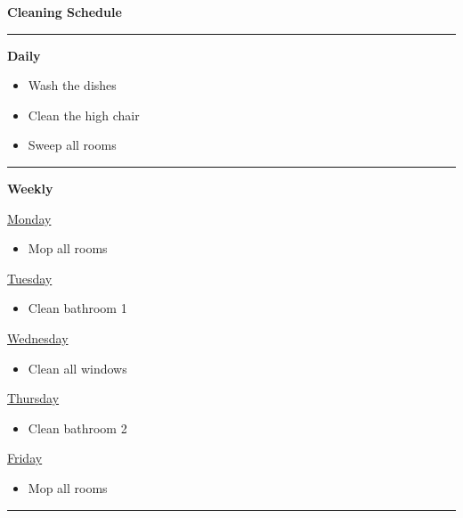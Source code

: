 \documentclass[14pt]{extarticle}
\begin{document}
\begin{center}
  \textsf{\textbf{\Large{}Cleaning Schedule}}
\end{center}

\bigskip

\hrule

\bigskip

\textsf{\textbf{\large{}Daily}}

\begin{itemize}
  \item Wash the dishes
  \item Clean the high chair
  \item Sweep all rooms
\end{itemize}

\hrule

\bigskip

\textsf{\textbf{\large{}Weekly}}

\bigskip

\textsf{\underline{Monday}}

\begin{itemize}
  \item Mop all rooms
\end{itemize}

\textsf{\underline{Tuesday}}

\begin{itemize}
  \item Clean bathroom 1
\end{itemize}

\textsf{\underline{Wednesday}}

\begin{itemize}
  \item Clean all windows
\end{itemize}

\textsf{\underline{Thursday}}

\begin{itemize}
  \item Clean bathroom 2
\end{itemize}

\textsf{\underline{Friday}}

\begin{itemize}
  \item Mop all rooms
\end{itemize}

\bigskip

\hrule
\end{document}

